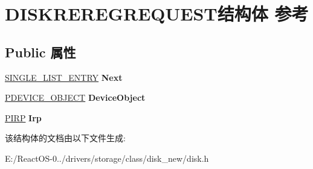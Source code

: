 \hypertarget{struct_d_i_s_k_r_e_r_e_g_r_e_q_u_e_s_t}{}\section{D\+I\+S\+K\+R\+E\+R\+E\+G\+R\+E\+Q\+U\+E\+S\+T结构体 参考}
\label{struct_d_i_s_k_r_e_r_e_g_r_e_q_u_e_s_t}
\subsection*{Public 属性}
\begin{DoxyCompactItemize}
\item 
\mbox{\label{struct_d_i_s_k_r_e_r_e_g_r_e_q_u_e_s_t_a251a26548be21e71b224d25dffa455e2}} 
\hyperlink{struct___s_i_n_g_l_e___l_i_s_t___e_n_t_r_y}{S\+I\+N\+G\+L\+E\+\_\+\+L\+I\+S\+T\+\_\+\+E\+N\+T\+RY} {\bfseries Next}
\item 
\mbox{\label{struct_d_i_s_k_r_e_r_e_g_r_e_q_u_e_s_t_aa749688bb7724a0b2fe9b089a981f145}} 
\hyperlink{struct___d_e_v_i_c_e___o_b_j_e_c_t}{P\+D\+E\+V\+I\+C\+E\+\_\+\+O\+B\+J\+E\+CT} {\bfseries Device\+Object}
\item 
\mbox{\label{struct_d_i_s_k_r_e_r_e_g_r_e_q_u_e_s_t_ac942df53e9c925f643aae863631a519a}} 
\hyperlink{interfacevoid}{P\+I\+RP} {\bfseries Irp}
\end{DoxyCompactItemize}


该结构体的文档由以下文件生成\+:\begin{DoxyCompactItemize}
\item 
E\+:/\+React\+O\+S-\/0../drivers/storage/class/disk\+\_\+new/disk.\+h\end{DoxyCompactItemize}
